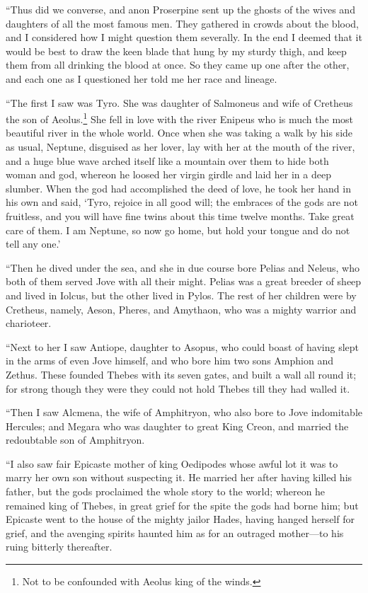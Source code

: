 “Thus did we converse, and anon Proserpine sent up the ghosts of the wives and
daughters of all the most famous men. They gathered in crowds about the blood,
and I considered how I might question them severally. In the end I deemed that
it would be best to draw the keen blade that hung by my sturdy thigh, and keep
them from all drinking the blood at once. So they came up one after the other,
and each one as I questioned her told me her race and lineage.

“The first I saw was Tyro. She was daughter of Salmoneus and wife of Cretheus
the son of Aeolus.\footnote{Not to be confounded with Aeolus king of the winds.} She fell in love with the river
Enipeus who is much the most beautiful river in the whole world. Once when she
was taking a walk by his side as usual, Neptune, disguised as her lover, lay
with her at the mouth of the river, and a huge blue wave arched itself like a
mountain over them to hide both woman and god, whereon he loosed her virgin
girdle and laid her in a deep slumber. When the god had accomplished the deed
of love, he took her hand in his own and said, ‘Tyro, rejoice in all good will;
the embraces of the gods are not fruitless, and you will have fine twins about
this time twelve months. Take great care of them. I am Neptune, so now go home,
but hold your tongue and do not tell any one.’

“Then he dived under the sea, and she in due course bore Pelias and Neleus, who
both of them served Jove with all their might. Pelias was a great breeder of
sheep and lived in Iolcus, but the other lived in Pylos. The rest of her
children were by Cretheus, namely, Aeson, Pheres, and Amythaon, who was a
mighty warrior and charioteer.

“Next to her I saw Antiope, daughter to Asopus, who could boast of having slept
in the arms of even Jove himself, and who bore him two sons Amphion and Zethus.
These founded Thebes with its seven gates, and built a wall all round it; for
strong though they were they could not hold Thebes till they had walled it.

“Then I saw Alcmena, the wife of Amphitryon, who also bore to Jove indomitable
Hercules; and Megara who was daughter to great King Creon, and married the
redoubtable son of Amphitryon.

“I also saw fair Epicaste mother of king Oedipodes whose awful lot it was to
marry her own son without suspecting it. He married her after having killed his
father, but the gods proclaimed the whole story to the world; whereon he
remained king of Thebes, in great grief for the spite the gods had borne him;
but Epicaste went to the house of the mighty jailor Hades, having hanged
herself for grief, and the avenging spirits haunted him as for an outraged
mother—to his ruing bitterly thereafter.

